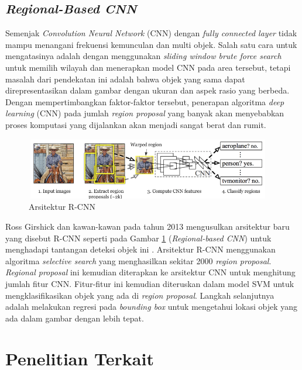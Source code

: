 \subsection{\textit{Regional-Based CNN}}
\label{subsec:rcnn}

Semenjak\textit{ Convolution Neural Network} (CNN) dengan \textit{fully connected layer} tidak mampu menangani frekuensi kemunculan dan multi objek. Salah satu cara untuk mengatasinya adalah dengan menggunakan \textit{sliding window brute force search} untuk memilih wilayah dan menerapkan model CNN pada area tersebut, tetapi masalah dari pendekatan ini adalah bahwa objek yang sama dapat direpresentasikan dalam gambar dengan ukuran dan aspek rasio yang berbeda. Dengan mempertimbangkan faktor-faktor tersebut, penerapan algoritma \textit{deep learning} (CNN) pada jumlah \textit{region proposal} yang banyak akan menyebabkan proses komputasi yang dijalankan akan menjadi sangat berat dan rumit.

\begin{figure}[h!]
	\centering
	\includegraphics[scale=0.3]{gambar/rcnn.png}
	\caption{Arsitektur R-CNN \citep{arch-rcnn}}
	\label{fig:rcnn}
\end{figure}

Ross Girshick dan kawan-kawan pada tahun 2013 mengusulkan arsitektur baru yang disebut R-CNN seperti pada Gambar \ref{fig:rcnn} (\textit{Regional-based CNN}) untuk menghadapi tantangan deteksi objek ini \citep{rcnn}. Arsitektur R-CNN menggunakan algoritma \textit{selective search} yang menghasilkan sekitar 2000 \textit{region proposal}. \textit{Regional proposal} ini kemudian diterapkan ke arsitektur CNN untuk menghitung jumlah fitur CNN. Fitur-fitur ini kemudian diteruskan dalam model SVM untuk mengklasifikasikan objek yang ada di \textit{region proposal}. Langkah selanjutnya adalah melakukan regresi pada \textit{bounding box} untuk mengetahui lokasi objek yang ada dalam gambar dengan lebih tepat.

\section{Penelitian Terkait}
\label{penelitianterkait}

